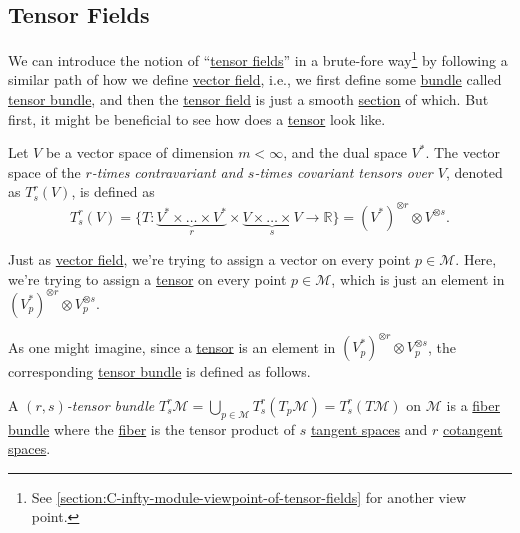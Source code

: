 \subsection{Tensor Fields}
We can introduce the notion of ``\hyperref[def:tensor-field]{tensor fields}'' in a brute-fore way\footnote{See \autoref{section:C-infty-module-viewpoint-of-tensor-fields} for another view point.} by following a similar path of how we define \hyperref[def:vector-field*]{vector field}, i.e., we first define some \hyperref[def:bundle]{bundle} called \hyperref[def:tensor-bundle]{tensor bundle}, and then the \hyperref[def:tensor-field]{tensor field} is just a smooth \hyperref[def:section]{section} of which. But first, it might be beneficial to see how does a \hyperref[def:tensor]{tensor} look like.

\begin{definition}[Tensor]\label{def:tensor}
	Let \(V\) be a vector space of dimension \(m < \infty \), and the dual space \(V^{\ast}\). The vector space of the \emph{\(r\)-times contravariant and \(s\)-times covariant tensors over \(V\)}, denoted as \(T_s^r(V) \), is defined as
	\[
		T_s^r(V) = \{ T\colon \underbrace{V^{\ast} \times \dots \times V^{\ast} }_{r} \times \underbrace{V\times \dots \times V}_{s} \to \mathbb{R} \}
		= (V^{\ast})^{\otimes r} \otimes V^{\otimes s} .
	\]
\end{definition}

\begin{intuition}
	Just as \hyperref[def:vector-field]{vector field}, we're trying to assign a vector on every point \(p\in \mathcal{M} \). Here, we're trying to assign a \hyperref[def:tensor]{tensor} on every point \(p\in \mathcal{M} \), which is just an element in \((V_p ^{\ast} )^{\otimes r} \otimes V_p^{\otimes s}\).
\end{intuition}

As one might imagine, since a \hyperref[def:tensor]{tensor} is an element in \((V_p ^{\ast} )^{\otimes r} \otimes V_p^{\otimes s}\), the corresponding \hyperref[def:tensor-bundle]{tensor bundle} is defined as follows.

\begin{definition}\label{def:tensor-bundle}
	A \emph{\((r, s)\)-tensor bundle} \(T^r_s \mathcal{M} = \bigcup_{p\in \mathcal{M} }T^r_s(T_p \mathcal{M} ) = T^r_s (T \mathcal{M} )\) on \(\mathcal{M} \) is a \hyperref[def:bundle]{fiber bundle} where the \hyperref[def:fiber]{fiber} is the tensor product of \(s\) \hyperref[def:tangent-space]{tangent spaces} and \(r\) \hyperref[def:cotangent-space]{cotangent spaces}.
\end{definition}

